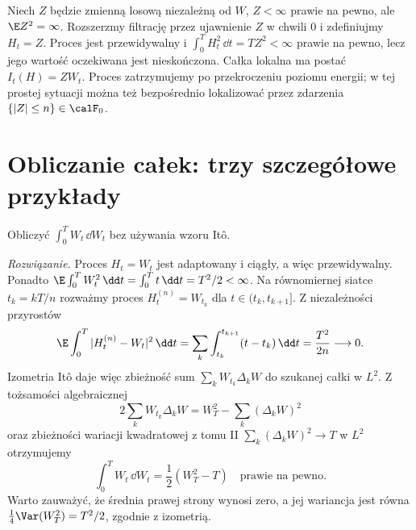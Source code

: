 \begin{przyklad}
Niech $Z$ będzie zmienną losową niezależną od $W$,
$Z<\infty$ prawie na pewno, ale $\E Z^2=\infty$.
Rozszerzmy filtrację przez ujawnienie $Z$ w chwili $0$
i zdefiniujmy $H_t=Z$. Proces jest przewidywalny i
$\int_0^TH_t^2\,\dd t=TZ^2<\infty$ prawie na pewno,
lecz jego wartość oczekiwana jest nieskończona.
Całka lokalna ma postać $I_t(H)=ZW_t$.
Proces zatrzymujemy po przekroczeniu poziomu energii;
w tej prostej sytuacji można też bezpośrednio lokalizować
przez zdarzenia $\{|Z|\le n\}\in\calF_0$.
\end{przyklad}

\section{Obliczanie całek: trzy szczegółowe przykłady}
\begin{zadanie}\label{zad:W-dW}
Obliczyć $\int_0^T W_t\,\dd W_t$ bez używania wzoru Itô.

\emph{Rozwiązanie.}
Proces $H_t=W_t$ jest adaptowany i ciągły,
a więc przewidywalny. Ponadto
$\E\int_0^TW_t^2\,\dd t=\int_0^Tt\,\dd t=T^2/2<\infty$.
Na równomiernej siatce $t_k=kT/n$ rozważmy proces
$H_t^{(n)}=W_{t_k}$ dla $t\in(t_k,t_{k+1}]$.
Z niezależności przyrostów
\[
\E\int_0^T|H_t^{(n)}-W_t|^2\,\dd t
=\sum_k\int_{t_k}^{t_{k+1}}(t-t_k)\,\dd t
=\frac{T^2}{2n}\longrightarrow0.
\]
Izometria Itô daje więc zbieżność sum
$\sum_kW_{t_k}\Delta_kW$ do szukanej całki w $L^2$.
Z tożsamości algebraicznej
\[
2\sum_kW_{t_k}\Delta_kW
=W_T^2-\sum_k(\Delta_kW)^2
\]
oraz zbieżności wariacji kwadratowej z tomu II
$\sum_k(\Delta_kW)^2\to T$ w $L^2$ otrzymujemy
\[
\int_0^TW_t\,\dd W_t=\frac12(W_T^2-T)
\quad\text{prawie na pewno}.
\tag{2.13}\label{eq:W-dW}
\]
Warto zauważyć, że średnia prawej strony wynosi zero,
a jej wariancja jest równa
$\frac14\Var(W_T^2)=T^2/2$, zgodnie z izometrią.
\end{zadanie}

